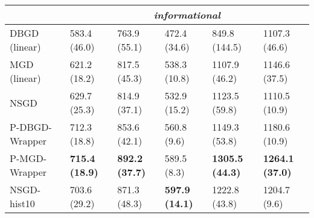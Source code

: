 \begin{tabular*}{\textwidth}{@{\extracolsep{\fill} } l  l l l l l  }
\midrule
& \multicolumn{5}{|c|}{\textit{informational}} \\
\midrule
DBGD (linear) & 583.4 {\tiny (46.0)} & 763.9 {\tiny (55.1)} & 472.4 {\tiny (34.6)} & 849.8 {\tiny (144.5)} & 1107.3 {\tiny (46.6)} \\
MGD (linear) & 621.2 {\tiny (18.2)} & 817.5 {\tiny (45.3)} & 538.3 {\tiny (10.8)} & 1107.9 {\tiny (46.2)} & 1146.6 {\tiny (37.5)} \\
NSGD & 629.7 {\tiny (25.3)} & 814.9 {\tiny (37.1)} & 532.9 {\tiny (15.2)} & 1123.5 {\tiny (59.8)} & 1110.5 {\tiny (10.9)} \\
P-DBGD-Wrapper & 712.3 {\tiny (18.8)} & 853.6 {\tiny (42.1)} & 560.8 {\tiny (9.6)} & 1149.3 {\tiny (53.8)} & 1180.6 {\tiny (10.9)} \\
P-MGD-Wrapper & \bf 715.4 {\tiny (18.9)} & \bf 892.2 {\tiny (37.7)} & 589.5 {\tiny (8.3)} & \bf 1305.5 {\tiny (44.3)} & \bf 1264.1 {\tiny (37.0)} \\
NSGD-hist10 & 703.6 {\tiny (29.2)} & 871.3 {\tiny (48.3)} & \bf 597.9 {\tiny (14.1)} & 1222.8 {\tiny (43.8)} & 1204.7 {\tiny (9.6)} \\
\bottomrule
\end{tabular*}
